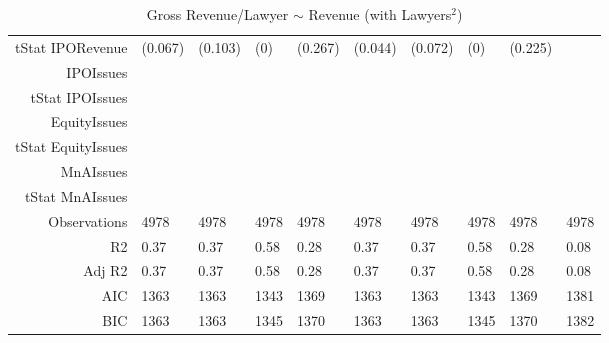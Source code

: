 \begin{table}[ht]
\begin{tabular}{rlllllllll}
  tStat IPORevenue & (0.067) & (0.103) & (0) & (0.267) & (0.044) & (0.072) & (0) & (0.225) &  \\ 
  IPOIssues &  &  &  &  &  &  &  &  &  \\ 
  tStat IPOIssues &  &  &  &  &  &  &  &  &  \\ 
  EquityIssues &  &  &  &  &  &  &  &  &  \\ 
  tStat EquityIssues &  &  &  &  &  &  &  &  &  \\ 
  MnAIssues &  &  &  &  &  &  &  &  &  \\ 
  tStat MnAIssues &  &  &  &  &  &  &  &  &  \\ 
  Observations & 4978 & 4978 & 4978 & 4978 & 4978 & 4978 & 4978 & 4978 & 4978 \\ 
  R2 & 0.37 & 0.37 & 0.58 & 0.28 & 0.37 & 0.37 & 0.58 & 0.28 & 0.08 \\ 
  Adj R2 & 0.37 & 0.37 & 0.58 & 0.28 & 0.37 & 0.37 & 0.58 & 0.28 & 0.08 \\ 
  AIC & 1363 & 1363 & 1343 & 1369 & 1363 & 1363 & 1343 & 1369 & 1381 \\ 
  BIC & 1363 & 1363 & 1345 & 1370 & 1363 & 1363 & 1345 & 1370 & 1382 \\ 
   \hline
\end{tabular}
\caption{Gross Revenue/Lawyer $\sim$ Revenue (with Lawyers$^2$)} 
\end{table}
